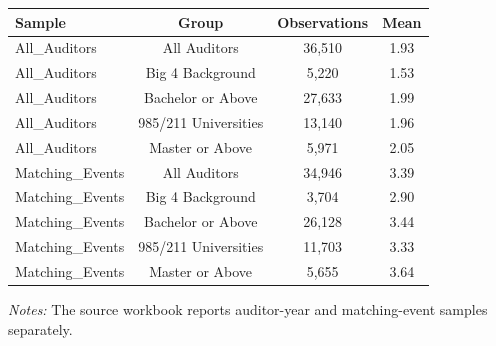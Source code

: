 \documentclass[10pt]{article}
\begin{document}
\begin{minipage}{19cm}\fontsize{10}{12}\selectfont\setlength{\tabcolsep}{4pt}\renewcommand{\arraystretch}{1.12}


\centering
{}
\begin{threeparttable}
\begin{tabular}{p{}ccc}
\toprule
Sample & Group & Observations & Mean \\
\midrule
All\_Auditors & All Auditors & 36,510 & 1.93 \\
All\_Auditors & Big 4 Background & 5,220 & 1.53 \\
All\_Auditors & Bachelor or Above & 27,633 & 1.99 \\
All\_Auditors & 985/211 Universities & 13,140 & 1.96 \\
All\_Auditors & Master or Above & 5,971 & 2.05 \\
Matching\_Events & All Auditors & 34,946 & 3.39 \\
Matching\_Events & Big 4 Background & 3,704 & 2.90 \\
Matching\_Events & Bachelor or Above & 26,128 & 3.44 \\
Matching\_Events & 985/211 Universities & 11,703 & 3.33 \\
Matching\_Events & Master or Above & 5,655 & 3.64 \\
\bottomrule
\end{tabular}
\begin{tablenotes}\fontsize{9}{11}\selectfont
\item \raggedright \fontsize{9}{11}\selectfont \textit{Notes:} The source workbook reports auditor-year and matching-event samples separately.
\end{tablenotes}
\end{threeparttable}

\end{minipage}
\end{document}

